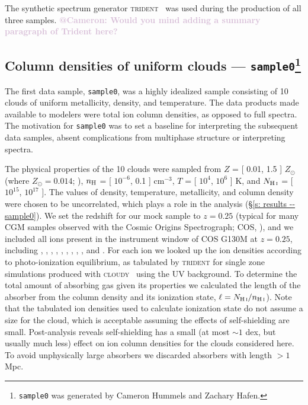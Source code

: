 \documentclass[fleqn,usenatbib]{mnras}
\makeatletter
\newcommand{\atcameron}[1]{\textcolor{Thistle}{\textbf{@Cameron: #1}}}
\makeatother
\begin{document}
The synthetic spectrum generator \textsc{trident}~\citep{Hummels2017} was used during the production of all three samples.
\atcameron{
Would you mind adding a summary paragraph of Trident here?
}

\subsection[Column densities of uniform clouds --- \texttt{sample0}]{Column densities of uniform clouds --- \texttt{sample0}\footnote{
\texttt{sample0} was generated by Cameron Hummels and Zachary Hafen.}}
\label{s: data generation -- sample0}

The first data sample, \texttt{sample0}, was a highly idealized sample consisting of 10 clouds of uniform metallicity, density, and temperature.
The data products made available to modelers were total ion column densities, as opposed to full spectra.
The motivation for \texttt{sample0} was to set a baseline for interpreting the subsequent data samples, absent complications from multiphase structure or interpreting spectra.

The physical properties of the 10 clouds were sampled from $Z$ = [ 0.01, 1.5 ] $Z_\odot$ (where $Z_\odot = 0.014$; \citealt{Asplund2009}), $n_{\rm H}$ = [ $10^{-6}$, 0.1 ] cm$^{-3}$, $T$ = [ $10^4$, $10^6$ ] K, and $N_{\ion{H}{I}}$ = [ $10^{15}$, $10^{17}$ ].
The values of density, temperature, metallicity, and  column density were chosen to be uncorrelated, which plays a role in the analysis (\S\ref{s: results -- sample0}).
We set the redshift for our mock sample to $z=0.25$ (typical for many CGM samples observed with the Cosmic Origins Spectrograph; COS, \citealt{Green2012}), and we included all ions present in the instrument window of COS G130M at $z=0.25$, including , , , , , , ,  , , and .
For each ion we looked up the ion densities according to photo-ionization equilibrium, as tabulated by \textsc{trident} for single zone simulations produced with \textsc{cloudy}~\citep{Ferland2013} using the \cite{Haardt2012} UV background.
To determine the total amount of absorbing gas given its properties we calculated the length of the absorber from the  column density and its ionization state, $\ell = N_{\ion{H}{I}} / n_{\ion{H}{I}}$).
Note that the tabulated ion densities used to calculate ionization state do not assume a size for the cloud, which is acceptable assuming the effects of self-shielding are small.
Post-analysis reveals self-shielding has a small (at most $\sim 1$ dex, but usually much less) effect on ion column densities for the clouds considered here.
To avoid unphysically large absorbers we discarded absorbers with length $> 1$ Mpc.
\end{document}
